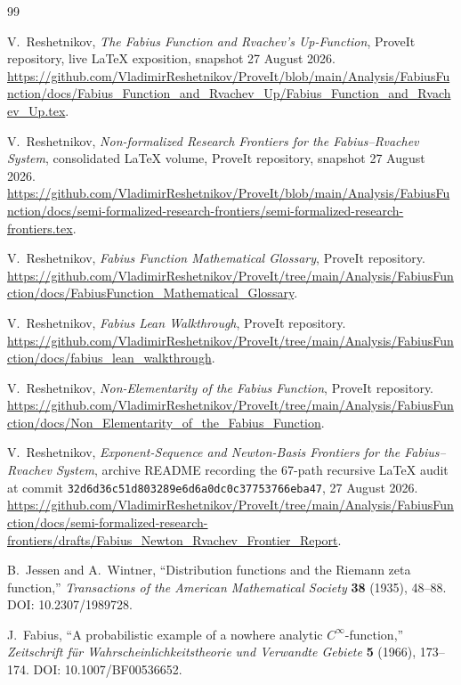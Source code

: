 \documentclass[11pt,oneside]{article}
\theoremstyle{definition}
\theoremstyle{remark}
\newcommand{\1}{\mathbf 1}
\begin{document}
\begin{thebibliography}{99}

V.~Reshetnikov,
\emph{The Fabius Function and Rvachev's Up-Function},
ProveIt repository, live LaTeX exposition, snapshot 27 August 2026.
\url{https://github.com/VladimirReshetnikov/ProveIt/blob/main/Analysis/FabiusFunction/docs/Fabius_Function_and_Rvachev_Up/Fabius_Function_and_Rvachev_Up.tex}.

V.~Reshetnikov,
\emph{Non-formalized Research Frontiers for the Fabius--Rvachev System},
consolidated LaTeX volume, ProveIt repository, snapshot 27 August 2026.
\url{https://github.com/VladimirReshetnikov/ProveIt/blob/main/Analysis/FabiusFunction/docs/semi-formalized-research-frontiers/semi-formalized-research-frontiers.tex}.

V.~Reshetnikov,
\emph{Fabius Function Mathematical Glossary}, ProveIt repository.
\url{https://github.com/VladimirReshetnikov/ProveIt/tree/main/Analysis/FabiusFunction/docs/FabiusFunction_Mathematical_Glossary}.

V.~Reshetnikov,
\emph{Fabius Lean Walkthrough}, ProveIt repository.
\url{https://github.com/VladimirReshetnikov/ProveIt/tree/main/Analysis/FabiusFunction/docs/fabius_lean_walkthrough}.

V.~Reshetnikov,
\emph{Non-Elementarity of the Fabius Function}, ProveIt repository.
\url{https://github.com/VladimirReshetnikov/ProveIt/tree/main/Analysis/FabiusFunction/docs/Non_Elementarity_of_the_Fabius_Function}.

V.~Reshetnikov,
\emph{Exponent-Sequence and Newton-Basis Frontiers for the Fabius--Rvachev System},
archive README recording the 67-path recursive LaTeX audit at commit
\texttt{32d6d36c51d803289e6d6a0dc0c37753766eba47}, 27 August 2026.
\url{https://github.com/VladimirReshetnikov/ProveIt/tree/main/Analysis/FabiusFunction/docs/semi-formalized-research-frontiers/drafts/Fabius_Newton_Rvachev_Frontier_Report}.

B.~Jessen and A.~Wintner,
``Distribution functions and the Riemann zeta function,''
\emph{Transactions of the American Mathematical Society} \textbf{38} (1935),
48--88.  DOI: 10.2307/1989728.

J.~Fabius,
``A probabilistic example of a nowhere analytic \(C^\infty\)-function,''
\emph{Zeitschrift f\"ur Wahrscheinlichkeitstheorie und Verwandte Gebiete}
\textbf{5} (1966), 173--174.  DOI: 10.1007/BF00536652.


\end{thebibliography}
\end{document}
